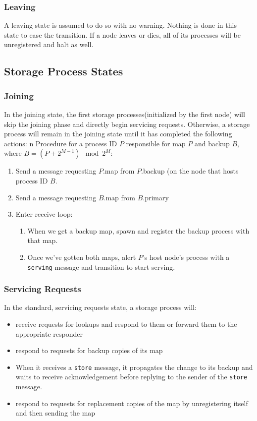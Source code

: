 \documentclass[a4paper]{article}
\begin{document}
\subsubsection{Leaving}
A leaving state is assumed to do so with no warning. Nothing is done in this state to ease the transition. If a node leaves or dies, all of its processes will be unregistered and halt as well.


\subsection{Storage Process States}

\subsubsection{Joining} 

In the joining state, the first storage processes(initialized by the first node) will skip the joining phase and directly begin servicing requests. Otherwise, a storage process will remain in the joining state until it has completed the following actions:
n   
Procedure for a process ID $P$ responsible for map $P$ and backup $B$, where $B = (P + 2^{M-1}) \mod 2^{M}$:
\begin{enumerate}
\item Send a message requesting $P$.map from $P$.backup (on the node that hosts process ID $B$.
\item Send a message requesting $B$.map from $B$.primary
\item Enter receive loop:
\begin{enumerate}
\item When we get a backup map, spawn and register the backup process with that map.
\item Once we've gotten both maps, alert $P$'s host node's process with a {\tt serving} message and transition to start serving.
\end{enumerate}
\end{enumerate}

\subsubsection{Servicing Requests}

In the standard, servicing requests state, a storage process will:
\begin{itemize}
\item receive requests for lookups and respond to them or forward them to the appropriate responder
\item respond to requests for backup copies of its map
\item When it receives a {\tt store} message, it propagates the change to its backup and waits to receive acknowledgement before replying to the sender of the {\tt store} message.
\item respond to requests for replacement copies of the map by unregistering itself and then sending the map
\end{itemize}
\end{document}
